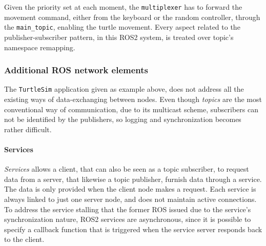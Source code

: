 Given the priority set at each moment, the \texttt{multiplexer} has to forward the movement command, either from the keyboard or the random controller, through the \texttt{main\_topic}, enabling the turtle movement. Every aspect related to the publisher-subscriber pattern, in this ROS2 system, is treated over topic's namespace remapping. %


\subsubsection{Additional ROS network elements}

The \texttt{TurtleSim} application given as example above, %
does not address all the existing ways of data-exchanging between nodes. Even though \textit{topics} are the most conventional way of communication, due to its multicast scheme, subscribers can not be identified by the publishers, so logging and synchronization becomes rather difficult.

\paragraph{Services}

\textit{Services} allows a client, that can also be seen as a topic subscriber, to request data from a server, that likewise a topic publisher, furnish data through a service. The data is only provided when the client node makes a request. Each service is always linked to just one server node, and does not maintain active connections. To address the service stalling that the former ROS issued due to the service's synchronization nature, ROS2 services are asynchronous, since it is possible to specify a callback function that is triggered when the service server responds back to the client.
                          

